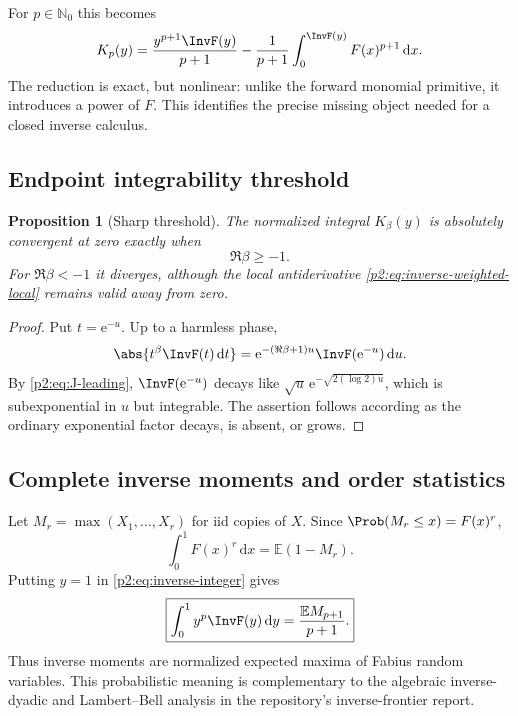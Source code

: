 \documentclass[11pt,oneside]{article}
\newtheorem{proposition}[theorem]{Proposition}
\theoremstyle{definition}
\theoremstyle{remark}
\newcommand{\E}{\mathbb E}
\newcommand{\N}{\mathbb N}
\newcommand{\dd}{\,\mathrm d}
\newcommand{\e}{\mathrm e}
\newcommand{\1}{\mathbf 1}
\begin{document}
For $p\in\N_0$ this becomes
\begin{equation}
 K_p(y)=\frac{y^{p+1}\InvF(y)}{p+1}
 -\frac1{p+1}\int_0^{\InvF(y)}F(x)^{p+1}\dd x.            \label{p2:eq:inverse-integer}
\end{equation}
The reduction is exact, but nonlinear: unlike the forward monomial primitive,
it introduces a power of $F$.  This identifies the precise missing object
needed for a closed inverse calculus.

\subsection{Endpoint integrability threshold}
\begin{proposition}[Sharp threshold]
\label{p2:prop:inverse-threshold}
The normalized integral $K_\beta(y)$ is absolutely convergent at zero exactly
when
\begin{equation}
 \Re\beta\ge-1.                                            \label{p2:eq:inverse-threshold}
\end{equation}
For $\Re\beta<-1$ it diverges, although the local antiderivative
\eqref{p2:eq:inverse-weighted-local} remains valid away from zero.
\end{proposition}

\begin{proof}
Put $t=\e^{-u}$.  Up to a harmless phase,
\[
 \abs{t^\beta\InvF(t)\dd t}
 =\e^{-(\Re\beta+1)u}\InvF(\e^{-u})\dd u.
\]
By \eqref{p2:eq:J-leading}, $\InvF(\e^{-u})$ decays like
$\sqrt u\,\e^{-\sqrt{2(\log2)u}}$, which is subexponential in $u$ but
integrable.  The assertion follows according as the ordinary exponential
factor decays, is absent, or grows.
\end{proof}

\subsection{Complete inverse moments and order statistics}
Let $M_r=\max(X_1,\ldots,X_r)$ for iid copies of $X$.  Since
$\Prob(M_r\le x)=F(x)^r$,
\begin{equation}
 \int_0^1F(x)^r\dd x=\E(1-M_r).                            \label{p2:eq:max-complement}
\end{equation}
Putting $y=1$ in \eqref{p2:eq:inverse-integer} gives
\begin{equation}
 \boxed{
 \int_0^1y^p\InvF(y)\dd y
 =\frac{\E M_{p+1}}{p+1}.}                                \label{p2:eq:inverse-order-stat}
\end{equation}
Thus inverse moments are normalized expected maxima of Fabius random variables.
This probabilistic meaning is complementary to the algebraic inverse-dyadic
and Lambert--Bell analysis in the repository's inverse-frontier report.
\end{document}
